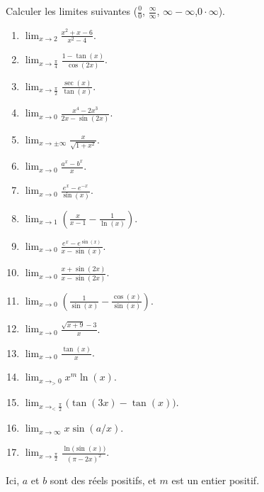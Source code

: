 \begin{exercice}\label{exo0010}

Calculer les limites suivantes ($\frac{ 0 }{ 0 }$, $\frac{ \infty }{ \infty }$, $\infty-\infty$,$0\cdot\infty$).
\begin{multicols}{2}
	
\begin{enumerate}

\item
$\lim_{x\to 2} \frac{ x^2+x-6 }{ x^2-4 }$.

\item
$\lim_{x\to \frac{ \pi }{ 4 }} \frac{ 1-\tan(x)}{\cos(2x)}$.

\item
$\lim_{x\to \frac{ \pi }{ 2 }} \frac{ \sec(x) }{ \tan(x) }$.

\item
$\lim_{x\to 0} \frac{ x^4-2x^3 }{ 2x-\sin(2x) }$.

\item
$\lim_{x\to \pm\infty} \frac{ x }{ \sqrt{1+x^2} }$.

\item
$\lim_{x\to 0} \frac{ a^x-b^x }{ x }$. 

\item
$\lim_{x\to 0} \frac{ e^x-e^{-x} }{ \sin(x) }$.

\item
$\lim_{x\to 1} \left( \frac{ x }{ x-1 }-\frac{1}{ \ln(x) } \right)$.


\item
$\lim_{x\to 0} \frac{ e^x-e^{\sin(x)} }{ x-\sin(x) }$.


\item
$\lim_{x\to 0} \frac{ x+\sin(2x) }{ x-\sin(2x) }$.



\item
$\lim_{x\to 0}\left( \frac{1}{ \sin(x) }-\frac{ \cos(x) }{ \sin(x) } \right)$.



\item
$\lim_{x\to 0} \frac{ \sqrt{x+9}-3 }{ x }$.



\item
$\lim_{x\to 0} \frac{ \tan(x) }{ x }$.


\item
$\lim_{x\to_{>} 0} x^m\ln(x)$.



\item
$\lim_{x\to_{<} \frac{ \pi }{ 2 }} \big( \tan(3x)-\tan(x)\big)$.


\item
$\lim_{x\to \infty} x\sin(a/x)$.

\item
$\lim_{x\to \frac{ \pi }{2}} \frac{ \ln\big( \sin(x) \big) }{ (\pi-2x)^2 }$.

\end{enumerate}
\end{multicols}
Ici, $a$ et $b$ sont des réels positifs, et $m$ est un entier positif.


\end{exercice}
